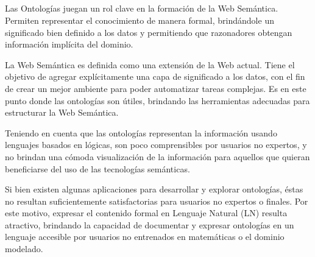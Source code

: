 \ \\
\ \\
\label{pagresum}
\\ \\
Las Ontologías juegan un rol clave en la formación de la Web Semántica. Permiten representar el conocimiento de manera formal, brindándole un significado bien definido a los datos y permitiendo que razonadores obtengan información implícita del dominio. 

La Web Semántica es definida como una extensión de la Web actual. Tiene el objetivo de agregar explícitamente una capa de significado a los datos, con el fin de crear un mejor ambiente para poder automatizar tareas complejas. Es en este punto donde las ontologías son útiles, brindando las herramientas adecuadas para estructurar la Web Semántica. 



Teniendo en cuenta que las ontologías representan la información usando lenguajes basados en lógicas, son poco comprensibles por usuarios no expertos, y no brindan una cómoda visualización de la información para aquellos que quieran beneficiarse del uso de las tecnologías semánticas.

Si bien existen algunas aplicaciones para desarrollar y explorar ontologías, éstas no resultan suficientemente satisfactorias para usuarios no expertos o finales. 
Por este motivo, expresar el contenido formal en Lenguaje Natural (LN) resulta atractivo, brindando la capacidad de documentar y expresar ontologías en un lenguaje accesible por usuarios no entrenados en matemáticas o el dominio modelado. 


